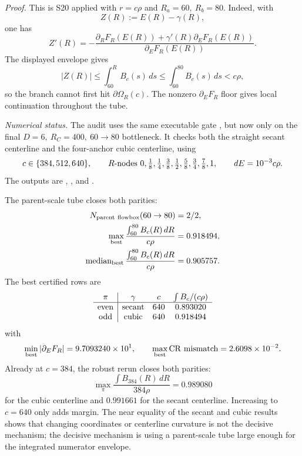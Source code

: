 \documentclass[aps,prd,onecolumn,notitlepage,nofootinbib,superscriptaddress,11pt,floatfix]{revtex4-2}
\begin{document}
\emph{Proof.}
This is S20 applied with \(r=c\rho\) and \(R_a=60,\ R_b=80\).  Indeed, with
\[
Z(R):=E(R)-\gamma(R),
\]
one has
\[
Z'(R)=-
\frac{\partial_RF_R(E(R))+\gamma'(R)\partial_EF_R(E(R))}
     {\partial_EF_R(E(R))}.
\]
The displayed envelope gives
\[
|Z(R)|\le \int_{60}^{R}B_c(s)\,ds
\le \int_{60}^{80}B_c(s)\,ds<c\rho,
\]
so the branch cannot first hit \(\partial\Omega_R(c)\).  The nonzero
\(\partial_EF_R\) floor gives local continuation throughout the tube.

\emph{Numerical status.}
The audit uses the same executable gate
, but now only on
the final \(D=6,\ R_C=400,\ 60\to80\) bottleneck.  It checks both the straight
secant centerline and the four-anchor cubic centerline, using
\[
c\in\{384,512,640\},\qquad
R\hbox{-nodes }0,\tfrac18,\tfrac14,\tfrac38,\tfrac12,\tfrac58,\tfrac34,\tfrac78,1,
\qquad dE=10^{-3}c\rho.
\]
The outputs are
,
, and
.

The parent-scale tube closes both parities:
\[
\begin{aligned}
N_{\rm parent\ flowbox}(60\to80)&=2/2,\\
\max_{\rm best}\frac{\int_{60}^{80}B_c(R)\,dR}{c\rho}&=0.918494,\\
\operatorname{median}_{\rm best}\frac{\int_{60}^{80}B_c(R)\,dR}{c\rho}&=0.905757.
\end{aligned}
\]
The best certified rows are
\[
\begin{array}{c|ccc}
\pi & \gamma & c & \int B_c/(c\rho)\\
\hline
{\rm even} & {\rm secant} & 640 & 0.893020\\
{\rm odd}  & {\rm cubic}  & 640 & 0.918494
\end{array}
\]
with
\[
\min_{\rm best}|\partial_EF_R|=9.7093240\times10^1,
\qquad
\max_{\rm best}{\rm CR\ mismatch}=2.6098\times10^{-2}.
\]
Already at \(c=384\), the robust rerun closes both parities:
\[
\max_{\pi}\frac{\int B_{384}(R)\,dR}{384\rho}=0.989080
\]
for the cubic centerline and \(0.991661\) for the secant centerline.
Increasing to \(c=640\) only adds margin.  The near equality of the secant and
cubic results shows that changing coordinates or centerline curvature is not
the decisive mechanism; the decisive mechanism is using a parent-scale tube
large enough for the integrated numerator envelope.
\end{document}
